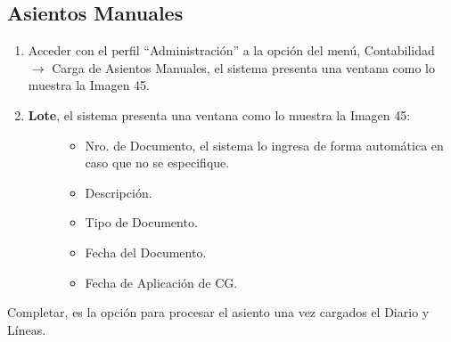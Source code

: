 \documentclass[letterpaper,10pt,spanish]{sphinxmanual}
\begin{document}
\subsection{Asientos Manuales}
\label{contabilidad:asientos-manuales}\begin{enumerate}
\item {} 
Acceder con el perfil ``Administración'' a la opción del menú, Contabilidad \(\rightarrow\) Carga de Asientos Manuales, el sistema presenta una ventana como lo muestra la Imagen 45.

\item {} \begin{description}
\item[{\textbf{Lote},  el sistema presenta una ventana como lo muestra la Imagen 45:}] \leavevmode\begin{itemize}
\item {} 
Nro. de Documento, el sistema lo ingresa de forma automática en caso que no se especifique.

\item {} 
Descripción.

\item {} 
Tipo de Documento.

\item {} 
Fecha del Documento.

\item {} 
Fecha de Aplicación de CG.

\end{itemize}

\end{description}

\end{enumerate}

Completar, es la opción para procesar el asiento una vez cargados el Diario y Líneas.
\end{document}
